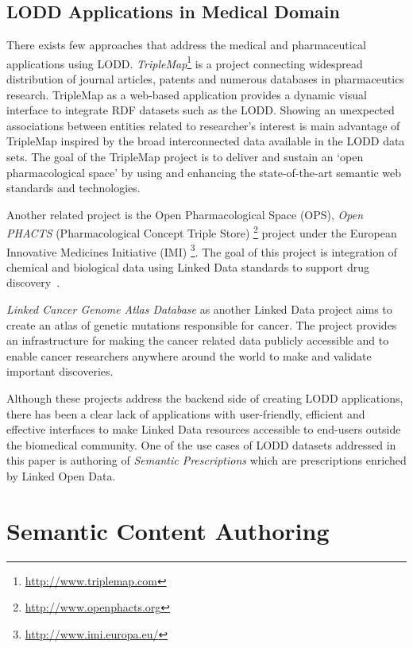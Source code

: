 \documentclass[journal]{IEEEtran}
\begin{document}
\subsection{LODD Applications in Medical Domain}

There exists few approaches that address the medical and pharmaceutical applications using LODD.
\emph{TripleMap}\footnote{\url{http://www.triplemap.com}} is a project connecting widespread distribution of journal articles, patents and numerous databases in pharmaceutics research.
TripleMap as a web-based application provides a dynamic visual interface to integrate RDF datasets such as the LODD.
Showing an unexpected associations between entities related to researcher's interest is main advantage of TripleMap inspired  by the broad interconnected data available in the LODD data sets.
The goal of the TripleMap project is to deliver and sustain an ‘open pharmacological space’ by using and enhancing the state-of-the-art semantic web standards and technologies\cite{TripleMap}.

 Another related project is the Open Pharmacological Space (OPS), \emph{Open PHACTS} (Pharmacological Concept Triple Store) \footnote{\url{http://www.openphacts.org}} project under the European Innovative Medicines Initiative (IMI) \footnote{\url{http://www.imi.europa.eu/}}.
 The goal of this project is integration of chemical and biological data using Linked Data standards to support drug discovery~\cite{Openphacts}.

\emph{Linked Cancer Genome Atlas Database}\cite{SAL13} as another Linked Data project aims to create an atlas of genetic mutations responsible for cancer.
The project provides an infrastructure for making the cancer related data publicly accessible and to enable cancer researchers anywhere around the world to make and validate important discoveries.

Although these projects address the backend side of creating LODD applications, there has been a clear lack of applications with user-friendly, efficient and effective interfaces to make Linked Data resources accessible to end-users outside the biomedical community.
One of the use cases of LODD datasets addressed in this paper is authoring of \emph{Semantic Prescriptions} which are prescriptions enriched by Linked Open Data.

\section{Semantic Content Authoring}
\label{sec:sca}
\end{document}
